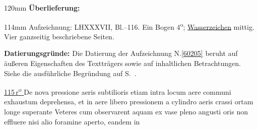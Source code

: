 %
\frenchspacing%
\begin{ledgroupsized}[r]{120mm}%
\footnotesize%
\pstart%
\noindent%
\textbf{Überlieferung:}%
\pend%
\end{ledgroupsized}%
\begin{ledgroupsized}[r]{114mm}%
\footnotesize%
\pstart%
\parindent -6mm%
%
Aufzeichnung:
LH\;XXXVII, Bl.--116.
Ein Bogen 4\textsuperscript{o};
\href{\Scan{LH_37_03_115-116wz}}{Wasserzeichen} mittig.
Vier ganzseitig beschriebene Seiten.
\pend%
\end{ledgroupsized}%
\vspace{5mm}%
\begin{ledgroup}%
\footnotesize%
\pstart%
\noindent%
\textbf{Datierungsgründe:}
Die Datierung der Aufzeichnung N.\;\ref{60205} beruht auf äußeren Eigenschaften des Text\-trägers %
sowie auf inhaltlichen Betrachtungen.
Siehe die ausführliche Begründung auf S.~\pageref{60205_dat}.%
\pend%
\end{ledgroup}%
%
\frenchspacing%
\vspace{8mm}%
\normalsize%
\pstart%
\noindent%
\lbrack%
\href{\Scan{LH_37_03_115r}}%
{115\,r\textsuperscript{o}%
}%
\rbrack%
\hfill%
De nova pressione aeris%
subtilioris%
%
\hfill%
%
\pend%
\pstart%
\centering%
etiam intra locum aere communi exhaustum%
deprehensa,
\pend%
\pstart%
\centering%
et in aere libero%
pressionem a cylindro aeris crassi ortam%
%
%
longe superante%
\pend%
\vspace{0.5em}%
\pstart%
\noindent%
%
%
Veteres%
cum observarent
aquam ex vase pleno%
angusti oris%
non
effluere %
nisi alio
foramine aperto,%
eandem in
